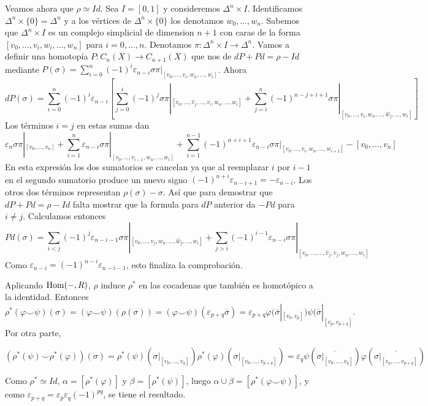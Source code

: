 \documentclass[TA.tex]{subfiles}
\begin{document}
\begin{dem}
Veamos ahora que $\rho\simeq Id$. Sea $I=[0,1]$ y consideremos $\Delta^n\times I$. Identificamos $\Delta^n\times\{0\}=\Delta^n$ y a los vértices de $\Delta^n\times\{0\}$ los denotamos $w_0,\dots, w_n$. Sabemos que $\Delta^n\times I$ es un complejo simplicial de dimension $n+1$ con caras de la forma $[v_0,\dots, v_i,w_i,\dots, w_n]$ para $i=0,\dots, n$. Denotamos $\pi:\Delta^n\times I\to \Delta^n$. Vamos a definir una homotopía $P:C_n(X)\to C_{n+1}(X)$ que nos de $dP+Pd=\rho-Id$ mediante $P(\sigma)=\sum_{i=0}^n(-1)^i\varepsilon_{n-i}\sigma\pi|_{[v_0,\dots, v_i,w_n,\dots,w_i]}$. Ahora
\[
dP(\sigma)=\sum_{i=0}^n(-1)^i\varepsilon_{n-i}\left[\sum_{j=0}^i(-1)^j\sigma\pi|_{[v_0,\dots,\hat{v}_j,\dots,  v_i,w_n,\dots,w_i]}+\sum_{j=i}^n(-1)^{n-j+i+1}\sigma\pi|_{[v_0,\dots, v_i,w_n,\dots,\hat{w}_j,\dots, w_i]}\right]
\]
Los términos $i=j$ en estas sumas dan
\[
\varepsilon_n\sigma\pi|_{[v_0,\dots,v_n]}+\sum_{i=1}^n\varepsilon_{n-i}\sigma\pi|_{[v_0,\dots,v_{i-1},w_n,\dots, w_i]}+\sum_{i=1}^{n-1}(-1)^{n+i+1}\varepsilon_{n-i}\sigma\pi|_{[v_0,\dots, v_i,w_n,\dots, w_{i+1}]}-[v_0,\dots, v_n]
\]
En esta expresión los dos sumatorios se cancelan ya que al reemplazar $i$ por $i-1$ en el segundo sumatorio produce un nuevo signo $(-1)^{n+i}\varepsilon_{n-i+1}=-\varepsilon_{n-i}$. Los otros dos términos representan $\rho(\sigma)-\sigma$. Así que para demostrar que $dP+Pd=\rho-Id$ falta mostrar que la formula para $dP$ anterior da $-Pd$ para $i\neq j$. Calculamos entonces
\[
Pd(\sigma)=\sum_{i<j}(-1)^j\varepsilon_{n-i-1}\sigma\pi|_{[v_0,\dots, v_j,w_n,\dots,\hat{w}_j,\dots,w_i]}+\sum_{j>i}(-1)^{i-1}\varepsilon_{n-i}\sigma\pi|_{[v_0,\dots, \dots,\hat{v}_j,v_j,w_n,\dots,w_i]}
\]
Como $\varepsilon_{n-i}=(-1)^{n-i}\varepsilon_{n-i-1}$, esto finaliza la comprobación.


Aplicando $\operatorname{Hom}(-,R)$, $\rho$ induce $\rho^*$ en las cocadenas que también es homotópico a la identidad. Entonces $$\rho^*(\varphi\smile\psi)(\sigma)=(\varphi\smile\psi)(\rho(\sigma))=(\varphi\smile\psi)(\varepsilon_{p+q}\overline{\sigma})=\varepsilon_{p+q}\varphi(\overline{\sigma}|_{[v_0, v_p]})\psi(\overline{\sigma}|_{[v_p,v_{p+q}]}.$$ 
Por otra parte, 

$$
(\rho^*(\psi)\smile\rho^*(\varphi))(\sigma)=\rho^*(\psi)(\sigma|_{[v_0,\dots, v_q]})\rho^*(\varphi)(\sigma|_{[v_0,\dots,v_{p+q}]})=\varepsilon_q\psi(\overline{\sigma|_{[v_0,\dots, v_q]}})\varphi(\overline{\sigma|_{[v_q, \dots,v_{p+q}]}})
$$

Como $\rho^*\simeq Id$, $\alpha=[\rho^*(\varphi)]$ y $\beta=[\rho^*(\psi)]$, luego $\alpha\cup\beta=[\rho^*(\varphi\smile\psi)]$, y como $\varepsilon_{p+q}=\varepsilon_p\varepsilon_q(-1)^{pq}$, se tiene el resultado. 
\end{dem}
\end{document}
